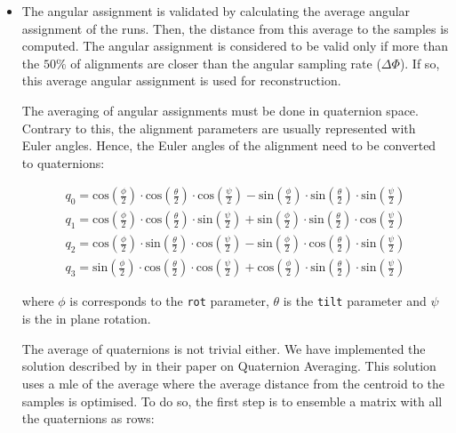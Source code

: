 \documentclass[../main.tex]{subfiles}
\begin{document}
\begin{itemize}
    \item The angular assignment is validated by calculating the average angular assignment of the runs. Then, the distance from this average to the samples is computed. The angular assignment is considered to be valid only if more than the $50 \si{\percent}$ of alignments are closer than the angular sampling rate ($\Delta\Phi$). If so, this average angular assignment is used for reconstruction.

    The averaging of angular assignments must be done in quaternion space. Contrary to this, the alignment parameters are usually represented with Euler angles. Hence, the Euler angles of the alignment need to be converted to quaternions:

    \begin{equation}
    \begin{split}
    q_0 = 
    \text{cos}\left( \frac{\phi}{2} \right) \cdot \text{cos}\left( \frac{\theta}{2} \right)  \cdot \text{cos}\left( \frac{\psi}{2} \right) -
    \text{sin}\left( \frac{\phi}{2} \right) \cdot \text{sin}\left( \frac{\theta}{2} \right)  \cdot \text{sin}\left( \frac{\psi}{2} \right) \\
    q_1 = 
    \text{cos}\left( \frac{\phi}{2} \right) \cdot \text{cos}\left( \frac{\theta}{2} \right)  \cdot \text{sin}\left( \frac{\psi}{2} \right) +
    \text{sin}\left( \frac{\phi}{2} \right) \cdot \text{sin}\left( \frac{\theta}{2} \right)  \cdot \text{cos}\left( \frac{\psi}{2} \right) \\
    q_2 = 
    \text{cos}\left( \frac{\phi}{2} \right) \cdot \text{sin}\left( \frac{\theta}{2} \right)  \cdot \text{cos}\left( \frac{\psi}{2} \right) -
    \text{sin}\left( \frac{\phi}{2} \right) \cdot \text{cos}\left( \frac{\theta}{2} \right)  \cdot \text{sin}\left( \frac{\psi}{2} \right) \\
    q_3 = 
    \text{sin}\left( \frac{\phi}{2} \right) \cdot \text{cos}\left( \frac{\theta}{2} \right)  \cdot \text{cos}\left( \frac{\psi}{2} \right) +
    \text{cos}\left( \frac{\phi}{2} \right) \cdot \text{sin}\left( \frac{\theta}{2} \right)  \cdot \text{sin}\left( \frac{\psi}{2} \right)
    \end{split}
    \end{equation}

    where $\phi$ is corresponds to the \texttt{rot} parameter, $\theta$ is the \texttt{tilt} parameter and $\psi$ is the in plane rotation.

    The average of quaternions is not trivial either. We have implemented the solution described by \citeauthor{landis2007} in their paper on Quaternion Averaging. This solution uses a \gls{mle} of the average where the average distance from the centroid to the samples is optimised\cite{landis2007}. To do so, the first step is to ensemble a matrix with all the quaternions as rows:


\end{itemize}
\end{document}
